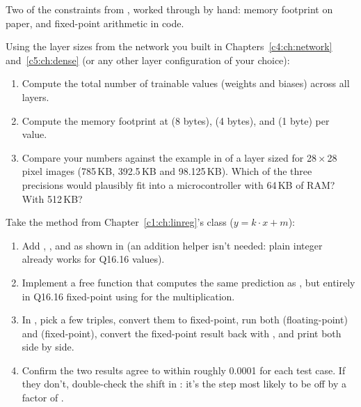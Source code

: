 \label{c10:set:7}
Two of the constraints from , worked through by hand: memory footprint on
paper, and fixed-point arithmetic in code.

\label{c10:ex:18}
Using the layer sizes from the network you built in Chapters~\ref{c4:ch:network}
and~\ref{c5:ch:dense} (or any other layer configuration of your choice):
\begin{enumerate}
  \item Compute the total number of trainable values (weights and biases) across all layers.
  \item Compute the memory footprint at  (8 bytes),  (4 bytes), and
     (1 byte) per value.
  \item Compare your numbers against the example in  of a layer sized for
    28\,×\,28 pixel images (785\,KB, 392.5\,KB and 98.125\,KB). Which of the three precisions would
    plausibly fit into a microcontroller with 64\,KB of RAM? With 512\,KB?
\end{enumerate}

\label{c10:ex:19}
Take the  method from Chapter~\ref{c1:ch:linreg}'s  class
($y = k \cdot x + m$):
\begin{enumerate}
  \item Add , , and  as shown in
     (an addition helper isn't needed: plain integer \code{+} already
    works for Q16.16 values).
  \item Implement a free function
     that
    computes the same prediction as , but entirely in Q16.16 fixed-point using
     for the multiplication.
  \item In , pick a few  triples, convert them to
    fixed-point, run both  (floating-point) and 
    (fixed-point), convert the fixed-point result back with , and print both side
    by side.
  \item Confirm the two results agree to within roughly 0.0001 for each test case. If they don't,
    double-check the \code{>>} shift in : it's the step most likely to be off
    by a factor of .
\end{enumerate}
